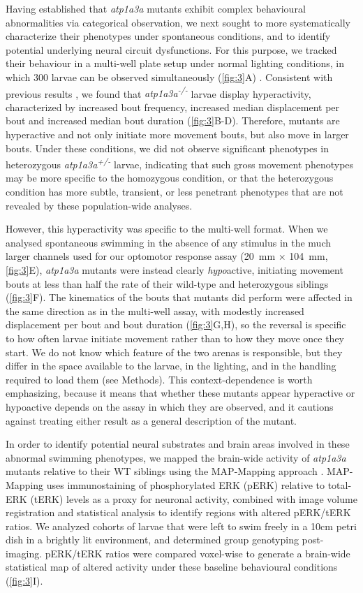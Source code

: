 \documentclass[9.5pt,lineno]{RandlettLab_elife}
\begin{document}
Having established that \emph{atp1a3a} mutants exhibit complex behavioural abnormalities via categorical observation, we next sought to more systematically characterize their phenotypes under spontaneous conditions, and to identify potential underlying neural circuit dysfunctions. 
For this purpose, we tracked their behaviour in a multi-well plate setup under normal lighting conditions, in which 300 larvae can be observed simultaneously (\autoref{fig:3}A) \citep{Randlett2019-fj,Lamire2023-he}.
Consistent with previous results \citep{Barlow2023}, we found that \emph{atp1a3a\textsuperscript{-/-}} larvae display hyperactivity, characterized by increased bout frequency, increased median displacement per bout and increased median bout duration (\autoref{fig:3}B-D).
Therefore, mutants are hyperactive and not only initiate more movement bouts, but also move in larger bouts.
Under these conditions, we did not observe significant phenotypes in heterozygous \emph{atp1a3a\textsuperscript{+/-}} larvae, indicating that such gross movement phenotypes may be more specific to the homozygous condition, or that the heterozygous condition has more subtle, transient, or less penetrant phenotypes that are not revealed by these population-wide analyses.

However, this hyperactivity was specific to the multi-well format.
When we analysed spontaneous swimming in the absence of any stimulus in the much larger channels used for our optomotor response assay (20~mm $\times$ 104~mm, \autoref{fig:3}E), \emph{atp1a3a} mutants were instead clearly \emph{hypo}active, initiating movement bouts at less than half the rate of their wild-type and heterozygous siblings (\autoref{fig:3}F).
The kinematics of the bouts that mutants did perform were affected in the same direction as in the multi-well assay, with modestly increased displacement per bout and bout duration (\autoref{fig:3}G,H), so the reversal is specific to how often larvae initiate movement rather than to how they move once they start.
We do not know which feature of the two arenas is responsible, but they differ in the space available to the larvae, in the lighting, and in the handling required to load them (see Methods).
This context-dependence is worth emphasizing, because it means that whether these mutants appear hyperactive or hypoactive depends on the assay in which they are observed, and it cautions against treating either result as a general description of the mutant.

In order to identify potential neural substrates and brain areas involved in these abnormal swimming phenotypes, we mapped the brain-wide activity of \emph{atp1a3a} mutants relative to their WT siblings using the MAP-Mapping approach \citep{Randlett2015}. 
MAP-Mapping uses immunostaining of phosphorylated ERK (pERK) relative to total-ERK (tERK) levels as a proxy for neuronal activity, combined with image volume registration and statistical analysis to identify regions with altered pERK/tERK ratios.
We analyzed cohorts of larvae that were left to swim freely in a 10cm petri dish in a brightly lit environment, and determined group genotyping post-imaging. 
pERK/tERK ratios were compared voxel-wise to generate a brain-wide statistical map of altered activity under these baseline behavioural conditions (\autoref{fig:3}I).
\end{document}

